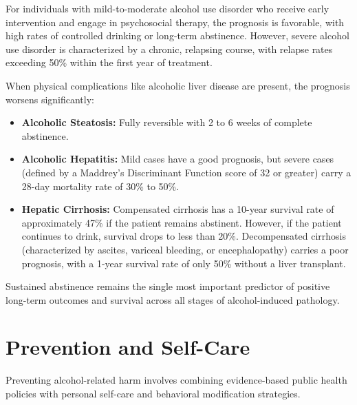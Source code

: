 For individuals with mild-to-moderate alcohol use disorder who receive early intervention and engage in psychosocial therapy, the prognosis is favorable, with high rates of controlled drinking or long-term abstinence. However, severe alcohol use disorder is characterized by a chronic, relapsing course, with relapse rates exceeding 50\% within the first year of treatment.

When physical complications like alcoholic liver disease are present, the prognosis worsens significantly:
\begin{itemize}
    \item \textbf{Alcoholic Steatosis:} Fully reversible with 2 to 6 weeks of complete abstinence.
    \item \textbf{Alcoholic Hepatitis:} Mild cases have a good prognosis, but severe cases (defined by a Maddrey's Discriminant Function score of 32 or greater) carry a 28-day mortality rate of 30\% to 50\%.
    \item \textbf{Hepatic Cirrhosis:} Compensated cirrhosis has a 10-year survival rate of approximately 47\% if the patient remains abstinent. However, if the patient continues to drink, survival drops to less than 20\%. Decompensated cirrhosis (characterized by ascites, variceal bleeding, or encephalopathy) carries a poor prognosis, with a 1-year survival rate of only 50\% without a liver transplant.
\end{itemize}
Sustained abstinence remains the single most important predictor of positive long-term outcomes and survival across all stages of alcohol-induced pathology.

\section*{Prevention and Self-Care}
Preventing alcohol-related harm involves combining evidence-based public health policies with personal self-care and behavioral modification strategies.


